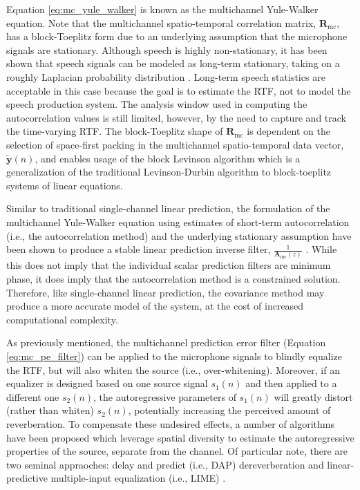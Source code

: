 Equation \ref{eq:mc_yule_walker} is known as the multichannel Yule-Walker equation. Note that the multichannel spatio-temporal correlation matrix, $\boldsymbol{R}_{\mathrm{mc}}$, has a block-Toeplitz form due to an underlying assumption that the microphone signals are stationary. Although speech is highly non-stationary, it has been shown that speech signals can be modeled as long-term stationary, taking on a roughly Laplacian probability distribution \citep{gazor2003speech}. Long-term speech statistics are acceptable in this case because the goal is to estimate the RTF, not to model the speech production system. The analysis window used in computing the autocorrelation values is still limited, however, by the need to capture and track the time-varying RTF. The block-Toeplitz shape of  $\boldsymbol{R}_{\mathrm{mc}}$ is dependent on the selection of space-first packing in the multichannel spatio-temporal data vector, $\boldsymbol{\tilde{y}}(n)$, and enables usage of the block Levinson algorithm \citep[i.e., the multichannel Levinson algorithm, ][]{whittle1963fitting} which is a generalization of the traditional Levinson-Durbin algorithm to block-toeplitz systems of linear equations.

Similar to traditional single-channel linear prediction, the formulation of the multichannel Yule-Walker equation using estimates of short-term autocorrelation (i.e., the autocorrelation method) and the underlying stationary assumption have been shown to produce a stable linear prediction inverse filter, $\frac{1}{\boldsymbol{A}_{\mathrm{mc}}(z)}$ \citep{inouye1983modeling}. While this does not imply that the individual scalar prediction filters are minimum phase, it does imply that the autocorrelation method is a constrained solution. Therefore, like single-channel linear prediction, the covariance method may produce a more accurate model of the system, at the cost of increased computational complexity.

As previously mentioned, the multichannel prediction error filter (Equation \ref{eq:mc_pe_filter}) can be applied to the microphone signals to blindly equalize the RTF, but will also whiten the source (i.e., over-whitening). Moreover, if an equalizer is designed based on one source signal $s_1(n)$ and then applied to a different one $s_2(n)$, the autoregressive parameters of $s_1(n)$  will greatly distort (rather than whiten) $s_2(n)$, potentially increasing the perceived amount of reverberation. To compensate these undesired effects, a number of algorithms have been proposed which leverage spatial diversity to estimate the autoregressive properties of the source, separate from the channel.  Of particular note, there are two seminal appraoches: delay and predict (i.e., DAP) dereverberation \citep{triki2006delay} and linear-predictive multiple-input equalization (i.e., LIME) \citep{delcroix2007precise}.

